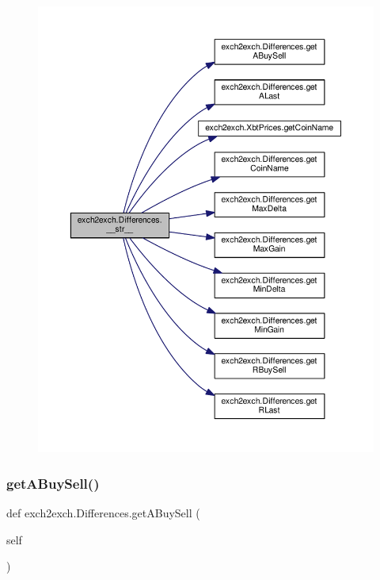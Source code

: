 \begin{figure}[H]
\begin{center}
\leavevmode
\includegraphics[width=350pt]{classexch2exch_1_1_differences_af2d3dc1abc5bfb7f84192e03af199c5f_cgraph}
\end{center}
\end{figure}
\mbox{\label{classexch2exch_1_1_differences_a5b1000fb221e0726fb36a8e9a0655d84}} 
\subsubsection{\texorpdfstring{get\+A\+Buy\+Sell()}{getABuySell()}}
{\footnotesize\ttfamily def exch2exch.\+Differences.\+get\+A\+Buy\+Sell (\begin{DoxyParamCaption}\item[{}]{self }\end{DoxyParamCaption})}



